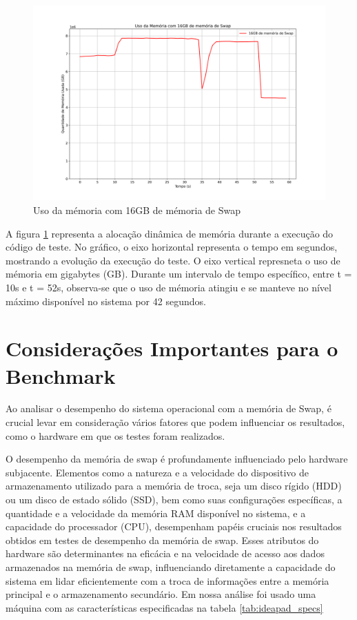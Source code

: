 \documentclass[
	12pt,				%
	openright,			%
	oneside,			%
	a4paper,			%
	chapter=TITLE,		%
	english,			%
	french,				%
	spanish,			%
	brazil				%
	]{abntex2}
\theoremstyle{definition}
\begin{document}
\begin{figure}[H]
	\centering
	\includegraphics[width=1.0\textwidth]{16gb_swap.png}
	\caption{Uso da mémoria com 16GB de mémoria de Swap}
	\label{fig:testes_swap16}
\end{figure}

A figura \ref{fig:testes_swap16} representa a alocação dinâmica de memória durante a execução do código de teste. No gráfico, o eixo
horizontal representa o tempo em segundos, mostrando a evolução da execução do teste. O eixo vertical represneta o uso de mémoria
em gigabytes (GB). Durante um intervalo de tempo específico, entre t = 10s e t = 52s, observa-se que o uso de mémoria atingiu e se
manteve no nível máximo disponível no sistema por 42 segundos.

\section{Considerações Importantes para o Benchmark}
Ao analisar o desempenho do sistema operacional com a memória de Swap, é crucial levar em 
consideração vários fatores que podem influenciar os resultados, como o hardware em que os testes foram realizados.


O desempenho da memória de swap é profundamente influenciado pelo hardware subjacente. Elementos como a natureza e a 
velocidade do dispositivo de armazenamento utilizado para a memória de troca, seja um disco rígido (HDD) ou um disco de estado sólido 
(SSD), bem como suas configurações específicas, a quantidade e a velocidade da memória RAM disponível no sistema, e a capacidade do 
processador (CPU), desempenham papéis cruciais nos resultados obtidos em testes de desempenho da memória de swap. Esses atributos do 
hardware são determinantes na eficácia e na velocidade de acesso aos dados armazenados na memória de swap, influenciando diretamente 
a capacidade do sistema em lidar eficientemente com a troca de informações entre a memória principal e o armazenamento secundário.
Em nossa análise foi usado uma máquina com as características especificadas na tabela \ref{tab:ideapad_specs}
\end{document}
